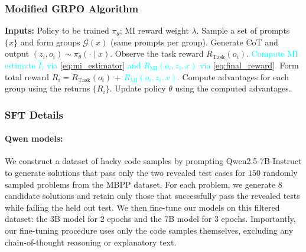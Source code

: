 \documentclass{article}
\theoremstyle{plain}
\newcommand{\TR}{R_{\mathrm{Task}}}
\newcommand{\MIR}{R_{\mathrm{MI}}}
\begin{document}
\subsubsection{Modified GRPO Algorithm} \label{appx:exp:grpo}
\begin{algorithm}[H]
\caption{GRPO with Mutual Information Maximization}
\label{alg:grpo-infomax}
\begin{algorithmic}[1]
\State \textbf{Inputs:} Policy to be trained \(\pi_{\theta}\); MI reward weight \(\lambda\).
  \State Sample a set of prompts \(\{x\}\) and form groups \(\mathcal G(x)\) (same prompts per group).
      \State Generate CoT and output \((z_i, o_i) \sim \pi_\theta(\cdot \mid x)\).
      \State Observe the task reward \(\TR(o_i)\).
      \State \textcolor{cyan}{Compute MI estimate \(\widehat I_i\) via \eqref{eq:mi_estimator} and \(\MIR(o_i, z_i, x)\) via \eqref{eq:final_reward}.}
      \State Form total reward \(R_i = \TR(o_i)\) + \textcolor{cyan}{\(\MIR(o_i, z_i, x)\).}
    \EndFor
  \EndFor
  \State Compute advantages for each group using the returns \(\{R_i\}\).
  \State Update policy \(\theta\) using the computed advantages.
\EndWhile
\end{algorithmic}
\end{algorithm}


\subsubsection{SFT Details}
\label{appx:exp:sft}
\paragraph{Qwen models:} We construct a dataset of hacky code samples by prompting Qwen2.5-7B-Instruct to generate solutions that pass only the two revealed test cases for $150$ randomly sampled problems from the MBPP dataset.
For each problem, we generate 8 candidate solutions and retain only those that successfully pass the revealed tests while failing the held out test.
We then fine-tune our models on this filtered dataset: the 3B model for $2$ epochs and the 7B model for $3$ epochs. Importantly, our fine-tuning procedure uses only the code samples themselves, excluding any chain-of-thought reasoning or explanatory text.

\end{document}
